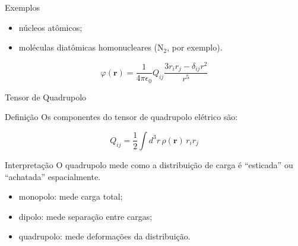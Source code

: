 \documentclass[aspectratio=169]{beamer}
\begin{document}
\begin{frame}


\begin{alertblock}{Exemplos}
\begin{itemize}
\item núcleos atômicos;
\item moléculas diatômicas homonucleares (\(\mathrm{N}_2\), por exemplo).
\end{itemize}
\end{alertblock}

\begin{eqbox}
\begin{equation}
\varphi(\mathbf r)
=
\frac{1}{4\pi\epsilon_0}
Q_{ij}
\frac{3r_i r_j-\delta_{ij}r^2}{r^5}
\tag{4.52}
\end{equation}
\end{eqbox}

\end{frame}

\begin{frame}{Tensor de Quadrupolo}

\begin{mybox}{Definição}
Os componentes do tensor de quadrupolo elétrico são:
\end{mybox}

\begin{eqbox}
\begin{equation}
Q_{ij}
=
\frac12
\int d^3r\,
\rho(\mathbf r)\,
r_i r_j
\tag{4.53}
\end{equation}
\end{eqbox}

\begin{alertblock}{Interpretação}
O quadrupolo mede como a distribuição de carga é
``esticada'' ou ``achatada'' espacialmente.
\end{alertblock}

\begin{itemize}
\item monopolo:
mede carga total;
\item dipolo:
mede separação entre cargas;
\item quadrupolo:
mede deformações da distribuição.
\end{itemize}

\end{frame}
\end{document}
